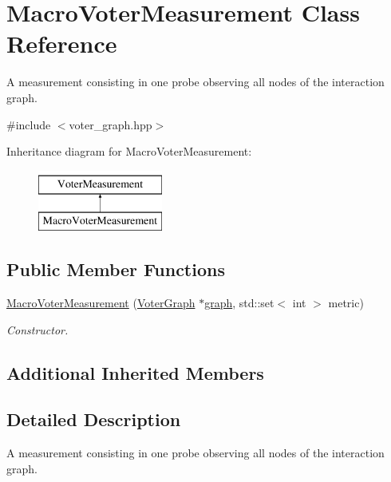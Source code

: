 \hypertarget{class_macro_voter_measurement}{}\section{Macro\+Voter\+Measurement Class Reference}
\label{class_macro_voter_measurement}


A measurement consisting in one probe observing all nodes of the interaction graph.  




{\ttfamily \#include $<$voter\+\_\+graph.\+hpp$>$}

Inheritance diagram for Macro\+Voter\+Measurement\+:\begin{figure}[H]
\begin{center}
\leavevmode
\includegraphics[height=2.000000cm]{class_macro_voter_measurement}
\end{center}
\end{figure}
\subsection*{Public Member Functions}
\begin{DoxyCompactItemize}
\item 
\hyperlink{class_macro_voter_measurement_ae7042fb49d9096496ccb12826bef38be}{Macro\+Voter\+Measurement} (\hyperlink{class_voter_graph}{Voter\+Graph} $\ast$\hyperlink{class_voter_measurement_a8d22d4b78f7e2f4c747f5716c4885351}{graph}, std\+::set$<$ int $>$ metric)
\begin{DoxyCompactList}\small\item\em Constructor. \end{DoxyCompactList}\end{DoxyCompactItemize}
\subsection*{Additional Inherited Members}


\subsection{Detailed Description}
A measurement consisting in one probe observing all nodes of the interaction graph. 

